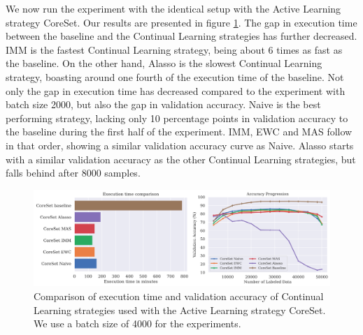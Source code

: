 We now run the experiment with the identical setup with the Active Learning strategy CoreSet. Our results are presented in figure \ref{fig:Evaluation:Results:CAL:CoreSet4000}. The gap in execution time between the baseline and the Continual Learning 
strategies has further decreased. IMM is the fastest Continual Learning strategy, being about 6 times as fast as the baseline. On the other hand, Alasso is the slowest Continual Learning strategy, boasting around one fourth of the execution time of the
baseline. Not only the gap in execution time has decreased compared to the experiment with batch size 2000, but also the gap in validation accuracy. Naive is the best performing strategy, lacking only 10 percentage points in validation accuracy to the
baseline during the first half of the experiment. IMM, EWC and MAS follow in that order, showing a similar validation accuracy curve as Naive. Alasso starts with a similar validation accuracy as the other Continual Learning strategies, but falls behind
after 8000 samples. \par


\begin{figure}[h]
    \centering
    \includegraphics[width=\linewidth]{images/results_CAL/CoreSet_CAL_4000b.png}
    \caption[Continual Active Learning CoreSet 4000 batch size]{Comparison of execution time and validation accuracy of Continual Learning strategies used with the Active Learning strategy
    CoreSet. We use a batch size of 4000 for the experiments.}
    \label{fig:Evaluation:Results:CAL:CoreSet4000}
\end{figure}

